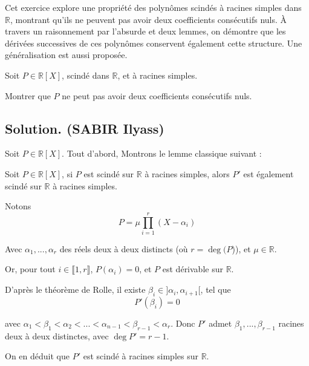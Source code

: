 Cet exercice explore une propri{\'e}t{\'e} des polyn{\^o}mes scind{\'e}s {\`a}
racines simples dans $\mathbb{R}$, montrant qu'ils ne peuvent pas avoir deux
coefficients cons{\'e}cutifs nuls. {\`A} travers un raisonnement par l'absurde
et deux lemmes, on d{\'e}montre que les d{\'e}riv{\'e}es successives de ces
polyn{\^o}mes conservent {\'e}galement cette structure. Une
g{\'e}n{\'e}ralisation est aussi propos{\'e}e.
\begin{exercise}[(Oral l'X 2007)]
Soit $P \in \mathbb{R}[X]$, scind{\'e} dans $\mathbb{R}$, et {\`a} racines
simples.

Montrer que $P$ ne peut pas avoir deux coefficients cons{\'e}cutifs nuls.

\end{exercise}

\subsection*{Solution. (SABIR Ilyass)}


Soit $P \in \mathbb{R}[X]$. Tout d'abord, Montrons le lemme classique suivant
:


Soit $P \in \mathbb{R}[X]$, si $P$ est scind{\'e} sur $\mathbb{R}$ {\`a}
racines simples, alors $P'$ est {\'e}galement scind{\'e} sur $\mathbb{R}$
{\`a} racines simples.


Notons
\[ P = \mu \prod_{i = 1}^r (X - \alpha_i) \]


Avec $\alpha_1, ..., \alpha_r$ des r{\'e}els deux {\`a} deux distincts (o{\`u}
$r = \deg (P$)), et $\mu \in \mathbb{R}$.

Or, pour tout $i \in \llbracket 1, r \rrbracket$, $P (\alpha_i) = 0$, et $P$
est d{\'e}rivable sur $\mathbb{R}$.

D'apr{\`e}s le th{\'e}or{\`e}me de Rolle, il existe $\beta_i \in] \alpha_i,
\alpha_{i + 1} [$, tel que
\[ P' (\beta_i) = 0 \]


avec $\alpha_1 < \beta_1 < \alpha_2 < ... < \alpha_{n - 1} < \beta_{r - 1} <
\alpha_r$. Donc $P'$ admet $\beta_1, ..., \beta_{r - 1}$ racines deux {\`a}
deux distinctes, avec $\deg P' = r - 1$.

On en d{\'e}duit que $P'$ est scind{\'e} {\`a} racines simples sur
$\mathbb{R}$.

\


